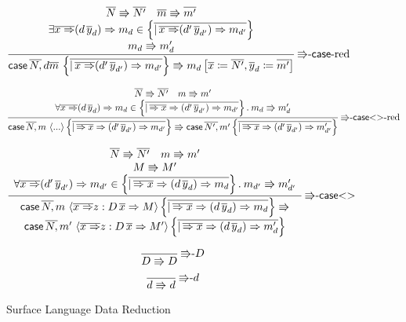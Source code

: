 \begin{figure}
\[
\frac{\begin{array}{c}
\overline{N}\Rrightarrow\overline{N'}\quad\overline{m}\Rrightarrow\overline{m'}\\
\exists\overline{x\Rightarrow}(d\,\overline{y}_{d})\Rightarrow m_{d}\in\left\{ \overline{|\,\overline{x\Rightarrow}(d'\,\overline{y}_{d'})\Rightarrow m_{d'}}\right\} \\
m_{d}\Rrightarrow m_{d}'
\end{array}}{\mathsf{case}\,\overline{N,}\,d\overline{m}\,\left\{ \overline{|\,\overline{x\Rightarrow}(d'\,\overline{y}_{d'})\Rightarrow m_{d'}}\right\} \Rrightarrow m_{d}\left[\overline{x}\coloneqq\overline{N'},\overline{y}_{d}\coloneqq\overline{m'}\right]}\,\textrm{\ensuremath{\Rrightarrow}-\ensuremath{\mathsf{case}}-red}
\]

\[
\frac{\begin{array}{c}
\overline{N}\Rrightarrow\overline{N'}\quad m\Rrightarrow m'\\
\forall\overline{x\Rightarrow}(d\,\overline{y}_{d})\Rightarrow m_{d}\in\left\{ \overline{|\,\overline{\Rightarrow x}\Rightarrow(d'\,\overline{y}_{d'})\Rightarrow m_{d'}}\right\} .\:m_{d}\Rrightarrow m_{d}'
\end{array}}{\mathsf{case}\,\overline{N,}\,m\,\left\langle ...\right\rangle \left\{ \overline{|\,\overline{\Rightarrow x}\Rightarrow(d'\,\overline{y}_{d'})\Rightarrow m_{d'}}\right\} \Rrightarrow\mathsf{case}\,\overline{N',}\,m'\left\{ \overline{|\,\overline{\Rightarrow x}\Rightarrow(d'\,\overline{y}_{d'})\Rightarrow m_{d'}'}\right\} }\,\textrm{\ensuremath{\Rrightarrow}-\ensuremath{\mathsf{case}}<>-red}
\]

\[
\frac{\begin{array}{c}
\overline{N}\Rrightarrow\overline{N'}\quad m\Rrightarrow m'\\
M\Rrightarrow M'\\
\forall\overline{x\Rightarrow}(d'\,\overline{y}_{d'})\Rightarrow m_{d'}\in\left\{ \overline{|\,\overline{\Rightarrow x}\Rightarrow(d\,\overline{y}_{d})\Rightarrow m_{d}}\right\} .\:m_{d'}\Rrightarrow m'_{d'}
\end{array}}{\begin{array}{c}
\mathsf{case}\,\overline{N,}\,m\,\left\langle \overline{x\Rightarrow}z:D\,\overline{x}\Rightarrow M\right\rangle \left\{ \overline{|\,\overline{\Rightarrow x}\Rightarrow(d\,\overline{y}_{d})\Rightarrow m_{d}}\right\} \Rrightarrow\\
\mathsf{case}\,\overline{N,}\,m'\,\left\langle \overline{x\Rightarrow}z:D\,\overline{x}\Rightarrow M'\right\rangle \left\{ \overline{|\,\overline{\Rightarrow x}\Rightarrow(d\,\overline{y}_{d})\Rightarrow m'_{d}}\right\} 
\end{array}}\,\textrm{\ensuremath{\Rrightarrow}-\ensuremath{\mathsf{case}}<>}
\]

\[
\frac{\,}{D\Rrightarrow D}\,\textrm{\ensuremath{\Rrightarrow}-}D
\]
\[
\frac{\,}{d\Rrightarrow d}\,\textrm{\ensuremath{\Rrightarrow}-}d
\]

\caption{Surface Language Data Reduction}
\label{fig:surface-data-red}
\end{figure}

